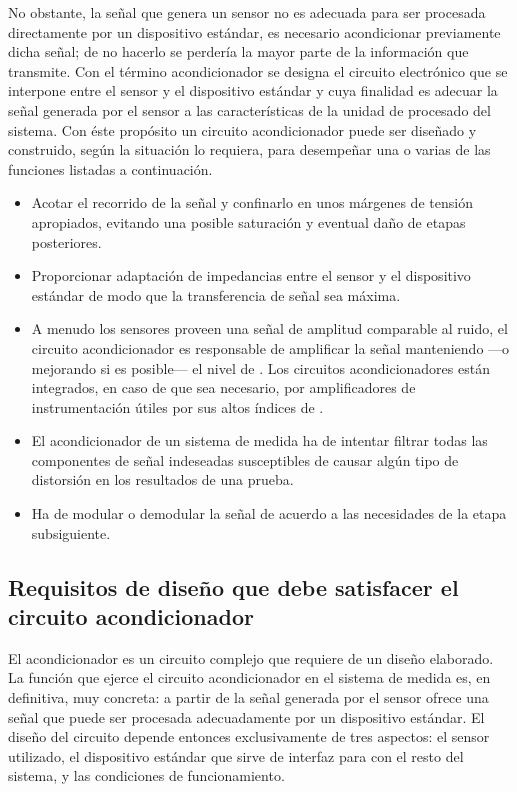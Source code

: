 No obstante, la señal que genera un sensor no es adecuada para ser
procesada directamente por un dispositivo estándar, es necesario
acondicionar previamente dicha señal; de no hacerlo se perdería la mayor
parte de la información que transmite. Con el término acondicionador se
designa el circuito electrónico que se interpone entre el sensor y el
dispositivo estándar y cuya finalidad es adecuar la señal generada por el
sensor a las características de la unidad de procesado del sistema. Con
éste propósito un circuito acondicionador puede ser diseñado y construido,
según la situación lo requiera, para desempeñar una o varias de las
funciones listadas a continuación.

\begin{itemize}
	\item Acotar el recorrido de la señal y confinarlo en unos márgenes
	    de tensión apropiados, evitando una posible saturación y
	    eventual daño de etapas posteriores.
	\item Proporcionar adaptación de impedancias entre el sensor y el
	    dispositivo estándar de modo que la transferencia de señal sea
	    máxima.
	\item A menudo los sensores proveen una señal de amplitud
	    comparable al ruido, el circuito acondicionador es responsable
	    de amplificar la señal manteniendo ---o mejorando si es
	    posible--- el nivel de . Los circuitos
	    acondicionadores están integrados, en caso de que sea
	    necesario, por amplificadores de instrumentación útiles por sus
	    altos índices de .
	\item El acondicionador de un sistema de medida ha de intentar
	    filtrar todas las componentes de señal indeseadas susceptibles
	    de causar algún tipo de distorsión en los resultados de una
	    prueba.
	\item Ha de modular o demodular la señal de acuerdo a las
	    necesidades de la etapa subsiguiente.
\end{itemize}


\subsection[Requisitos de diseño del circuito acondicionador]{Requisitos de
diseño que debe satisfacer el circuito acondicionador}

El acondicionador es un circuito complejo que requiere de un diseño
elaborado. La función que ejerce el circuito acondicionador en el sistema
de medida es, en definitiva, muy concreta: a partir de la señal generada
por el sensor ofrece una señal que puede ser procesada adecuadamente por un
dispositivo estándar. El diseño del circuito depende entonces
exclusivamente de tres aspectos: el sensor utilizado, el dispositivo
estándar que sirve de interfaz para con el resto del sistema, y las
condiciones de funcionamiento.

